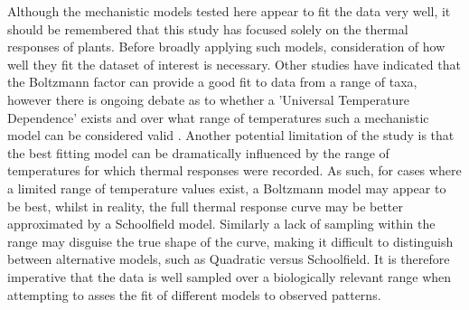 \documentclass[11pt]{article}
\begin{document}
Although the mechanistic models tested here appear to fit the data very well, it should be remembered that this study has focused solely on the thermal responses of plants. Before broadly applying such models, consideration of how well they fit the dataset of interest is necessary. Other studies have indicated that the Boltzmann factor can provide a good fit to data from a range of taxa, however there is ongoing debate as to whether a 'Universal Temperature Dependence' exists and over what range of temperatures such a mechanistic model can be considered valid \cite{gillooly2001effects, clarke2004there}. Another potential limitation of the study is that the best fitting model can be dramatically influenced by the range of temperatures for which thermal responses were recorded. As such, for cases where a limited range of temperature values exist, a Boltzmann model may appear to be best, whilst in reality, the full thermal response curve may be better approximated by a Schoolfield model. Similarly a lack of sampling within the range may disguise the true shape of the curve, making it difficult to distinguish between alternative models, such as Quadratic versus Schoolfield. It is therefore imperative that the data is well sampled over a biologically relevant range when attempting to asses the fit of different models to observed patterns. 
   
  


\end{document}
